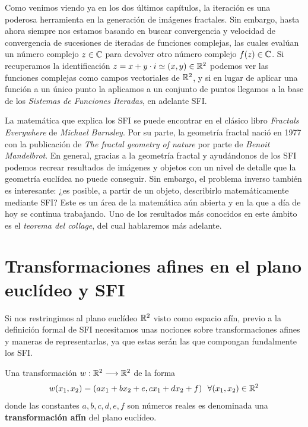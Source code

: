 
Como venimos viendo ya en los dos últimos capítulos, la iteración es una poderosa herramienta en la generación de imágenes fractales. Sin embargo, hasta ahora siempre nos estamos basando en buscar convergencia y velocidad de convergencia de sucesiones de iteradas de funciones complejas, las cuales evalúan un número complejo $z\in\mathbb{C}$ para devolver otro número complejo $f(z)\in\mathbb{C}$. Si recuperamos la identificación $z=x+y\cdot i\simeq (x,y)\in\mathbb{R}^2$ podemos ver las funciones complejas como campos vectoriales de $\mathbb{R}^2$, y si en lugar de aplicar una función a un único punto la aplicamos a un conjunto de puntos llegamos a la base de los \textit{Sistemas de Funciones Iteradas}, en adelante SFI. 

La matemática que explica los SFI se puede encontrar en el clásico libro \textit{Fractals Everywhere}\cite{Barnsley} de \textit{Michael Barnsley}. Por su parte, la geometría fractal nació en 1977 con la publicación de \textit{The fractal geometry of nature}\cite{alma991007242979704990} por parte de \textit{Benoit Mandelbrot}. En general, gracias a la geometría fractal y ayudándonos de los SFI podemos recrear resultados de imágenes y objetos con un nivel de detalle que la geometría euclídea no puede conseguir. Sin embargo, el problema inverso también es interesante: ¿es posible, a partir de un objeto, describirlo matemáticamente mediante SFI? Este es un área de la matemática aún abierta y en la que a día de hoy se continua trabajando. Uno de los resultados más conocidos en este ámbito es el \textit{teorema del collage}, del cual hablaremos más adelante. %

\section{Transformaciones afines en el plano euclídeo y SFI}

Si nos restringimos al plano euclídeo $\mathbb{R}^2$ visto como espacio afín, previo a la definición formal de SFI necesitamos unas nociones sobre transformaciones afines y maneras de representarlas, ya que estas serán las que compongan fundalmente los SFI.

\begin{definicion}
    Una transformación $w:\mathbb{R}^2\longrightarrow\mathbb{R}^2$ de la forma
    \begin{equation}
        w(x_1,x_2)=(ax_1+bx_2+e,cx_1+dx_2+f) \ \ \forall (x_1,x_2)\in\mathbb{R}^2
    \end{equation}
    donde las constantes $a,b,c,d,e,f$ son números reales es denominada una \textbf{transformación afín} del plano euclídeo.
\end{definicion}

